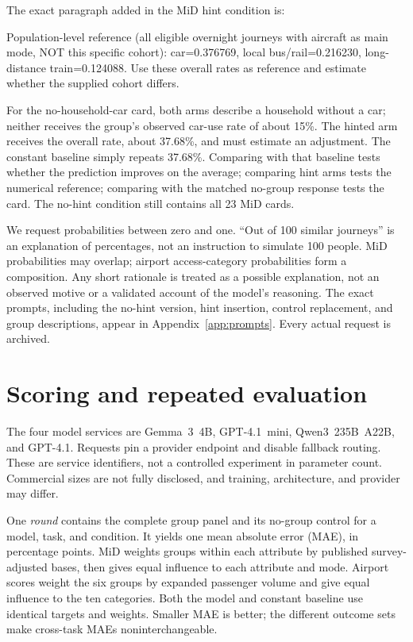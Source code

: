 \documentclass{article}
\begin{document}
The exact paragraph added in the MiD hint condition is:
\begin{promptbox}[title={Exact MiD overall-rate hint}]
Population-level reference (all eligible overnight journeys with aircraft as main mode, NOT this specific cohort): car=0.376769, local bus/rail=0.216230, long-distance train=0.124088. Use these overall rates as reference and estimate whether the supplied cohort differs.
\end{promptbox}
For the no-household-car card, both arms describe a household without a car; neither receives the group's observed car-use rate of about 15\%. The hinted arm receives the overall rate, about 37.68\%, and must estimate an adjustment. The constant baseline simply repeats 37.68\%. Comparing with that baseline tests whether the prediction improves on the average; comparing hint arms tests the numerical reference; comparing with the matched no-group response tests the card. The no-hint condition still contains all 23 MiD cards.

We request probabilities between zero and one. ``Out of 100 similar journeys'' is an explanation of percentages, not an instruction to simulate 100 people. MiD probabilities may overlap; airport access-category probabilities form a composition. Any short rationale is treated as a possible explanation, not an observed motive or a validated account of the model's reasoning. The exact prompts, including the no-hint version, hint insertion, control replacement, and group descriptions, appear in Appendix~\ref{app:prompts}. Every actual request is archived.

\section{Scoring and repeated evaluation}
The four model services are Gemma~3~4B, GPT-4.1~mini, Qwen3~235B~A22B, and GPT-4.1. Requests pin a provider endpoint and disable fallback routing. These are service identifiers, not a controlled experiment in parameter count. Commercial sizes are not fully disclosed, and training, architecture, and provider may differ.

One \emph{round} contains the complete group panel and its no-group control for a model, task, and condition. It yields one mean absolute error (MAE), in percentage points. MiD weights groups within each attribute by published survey-adjusted bases, then gives equal influence to each attribute and mode. Airport scores weight the six groups by expanded passenger volume and give equal influence to the ten categories. Both the model and constant baseline use identical targets and weights. Smaller MAE is better; the different outcome sets make cross-task MAEs noninterchangeable.
\end{document}
